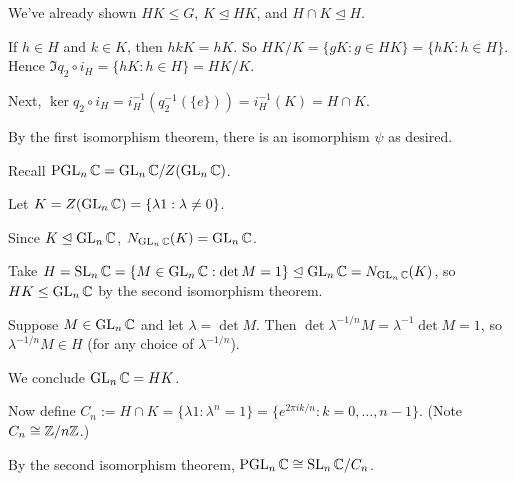 \documentclass[12pt,letterpaper]{report}
\begin{document}
\begin{center}
\end{center}

\begin{thmproof}
  We've already shown $HK \leq G$, $K \trianglelefteq HK$, and $H \cap K \trianglelefteq H$.

  If $h \in H$ and $k \in K$, then $hkK = hK$.
  So $HK/K = \{gK : g \in HK\} = \{hK : h \in H\}$.
  Hence $\Im q_2 \circ i_H = \{hK : h \in H\} = HK/K$.

  Next, $\ker q_2 \circ i_H = i_H^{-1}(q_2^{-1}(\{e\})) = i_H^{-1}(K) = H \cap K$.

  By the first isomorphism theorem, there is an isomorphism $\psi$ as desired.
\end{thmproof}

\begin{ex}
  Recall $\operatorname{PGL}_n\mathbb{C} = \operatorname{GL}_n\mathbb{C} / Z(\operatorname{GL}_n\mathbb{C})$.

  Let $K = Z(\operatorname{GL}_n\mathbb{C}) = \{\lambda 1 : \lambda \neq 0\}$.

  Since $K \trianglelefteq \operatorname{GL}_n\mathbb{C}$, $N_{\operatorname{GL}_n\mathbb{C}}(K) = \operatorname{GL}_n\mathbb{C}$.

  Take $H = \operatorname{SL}_n\mathbb{C} = \{M \in \operatorname{GL}_n\mathbb{C} : \det M = 1\}
    \trianglelefteq \operatorname{GL}_n\mathbb{C} = N_{\operatorname{GL}_n\mathbb{C}}(K)$, so $HK \leq \operatorname{GL}_n\mathbb{C}$ by the
  second isomorphism theorem.

  Suppose $M \in \operatorname{GL}_n\mathbb{C}$ and let $\lambda = \det M$.
  Then $\det \lambda^{-1/n}M = \lambda^{-1} \det M = 1$, so $\lambda^{-1/n}M \in H$ (for any
  choice of $\lambda^{-1/n}$).

  We conclude $\operatorname{GL}_n\mathbb{C} = HK$.

  Now define $C_n := H \cap K = \{\lambda 1 : \lambda^n = 1\}
    = \{e^{2\pi i k/n} : k = 0, \ldots, n - 1\}$.
  (Note $C_n \cong \mathbb{Z}/{n}\mathbb{Z}$.)

  By the second isomorphism theorem, $\operatorname{PGL}_n\mathbb{C} \cong \operatorname{SL}_n\mathbb{C}/C_n$.
\end{ex}

\end{document}
